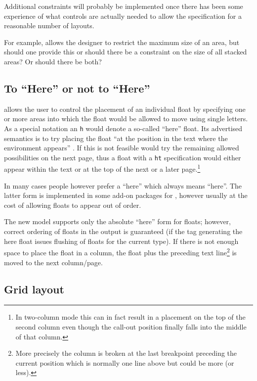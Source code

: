 \documentclass[twocolumn]{article}
\begin{document}
Additional constraints will probably be implemented
once there has been some experience of what controls are actually
needed to allow the specification for a reasonable number of layouts.

For example, \LaTeXe{} allows the designer to restrict the maximum size of
an area, but should one provide this or should there be a constraint
on the size of all stacked areas? Or should there be both?



\subsection{To ``Here'' or not to ``Here''}

\LaTeXe{} allows the user to control the placement of an individual float by
specifying one or more areas into which the float would be
allowed to move using single letters. As a special notation an
\texttt{h} would denote a so-called ``here'' float. Its advertised
semantics is to try placing the float ``at the position in the text
where the environment appears'' \cite[p.~197]{A-W:LLa94}.
If this is not feasible \LaTeXe{} would try the remaining
allowed possibilities on the next page, thus a float with a
\texttt{ht} specification  would either appear within the text or
at the top of the next or a later
page.\footnote{ In two-column mode
this can in fact result in a placement on the top of the second column
even though the call-out position finally falls into the middle of
that column.}

In many cases people however prefer a ``here'' which always means
``here''. The latter form is implemented in some add-on packages for
\LaTeXe{}, however usually at the cost of allowing floats to appear out
of order.

The new model supports only the absolute ``here'' form for floats;
however, correct ordering of floats in the output is guaranteed (if
the tag generating the here float issues flushing of floats for the
current type). If
there is not enough space to place the float in a column, the float
plus the preceding text line\footnote{More precisely the column is
broken at the last breakpoint preceding the current position which is
normally one line above but could be more (or less).} is moved to the
next column/\allowbreak page.


\subsection{Grid layout}
\end{document}
